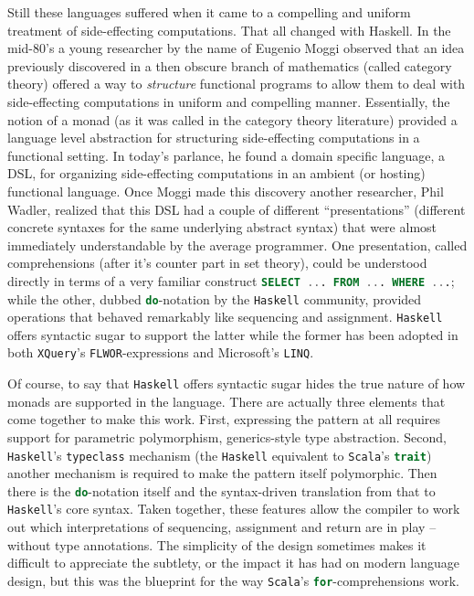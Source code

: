Still these languages suffered when it came to a compelling and
uniform treatment of side-effecting computations. That all changed
with Haskell. In the mid-80's a young researcher by the name of
Eugenio Moggi observed that an idea previously discovered in a then
obscure branch of mathematics (called category theory) offered a way
to \emph{structure} functional programs to allow them to deal with
side-effecting computations in uniform and compelling
manner. Essentially, the notion of a monad (as it was called in the
category theory literature) provided a language level abstraction for
structuring side-effecting computations in a functional setting. In
today's parlance, he found a domain specific language, a DSL, for
organizing side-effecting computations in an ambient (or hosting)
functional language. Once Moggi made this discovery another
researcher, Phil Wadler, realized that this DSL had a couple of
different ``presentations'' (different concrete syntaxes for the same
underlying abstract syntax) that were almost immediately
understandable by the average programmer. One presentation, called
comprehensions (after it's counter part in set theory), could be
understood directly in terms of a very familiar construct
\lstinline[language=SQL]!SELECT ... FROM ... WHERE ...!; while the
other, dubbed \lstinline[language=Haskell]!do!-notation by the
\texttt{Haskell} community, provided operations that behaved
remarkably like sequencing and assignment. \texttt{Haskell} offers
syntactic sugar to support the latter while the former has been
adopted in both \texttt{XQuery}'s
\lstinline[language=XML]!FLWOR!-expressions and Microsoft's
\texttt{LINQ}.

Of course, to say that \texttt{Haskell} offers syntactic sugar hides
the true nature of how monads are supported in the language. There are
actually three elements that come together to make this work. First,
expressing the pattern at all requires support for parametric
polymorphism, generics-style type abstraction. Second,
\texttt{Haskell}'s \lstinline[language=Haskell]!typeclass! mechanism
(the \texttt{Haskell} equivalent to \texttt{Scala}'s
\lstinline[language=Scala]!trait!) another mechanism is required to
make the pattern itself polymorphic. Then there is the
\lstinline[language=Haskell]!do!-notation itself and the syntax-driven
translation from that to \texttt{Haskell}'s core syntax. Taken
together, these features allow the compiler to work out which
interpretations of sequencing, assignment and return are in play --
without type annotations. The simplicity of the design sometimes makes
it difficult to appreciate the subtlety, or the impact it has had on
modern language design, but this was the blueprint for the way
\texttt{Scala}'s \lstinline[language=Scala]!for!-comprehensions work.

